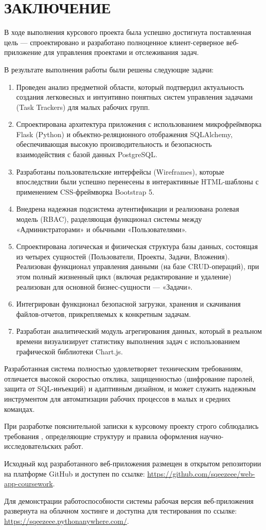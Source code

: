 \section*{ЗАКЛЮЧЕНИЕ}

В ходе выполнения курсового проекта была успешно достигнута поставленная цель --- спроектировано и разработано полноценное клиент-серверное веб-приложение для управления проектами и отслеживания задач.

В результате выполнения работы были решены следующие задачи:
\begin{enumerate}
    \item Проведен анализ предметной области, который подтвердил актуальность создания легковесных и интуитивно понятных систем управления задачами (Task Trackers) для малых рабочих групп.
    \item Спроектирована архитектура приложения с использованием микрофреймворка Flask (Python) и объектно-реляционного отображения SQLAlchemy, обеспечивающая высокую производительность и безопасность взаимодействия с базой данных PostgreSQL.
    \item Разработаны пользовательские интерфейсы (Wireframes), которые впоследствии были успешно перенесены в интерактивные HTML-шаблоны с применением CSS-фреймворка Bootstrap 5.
    \item Внедрена надежная подсистема аутентификации и реализована ролевая модель (RBAC), разделяющая функционал системы между «Администраторами» и обычными «Пользователями».
    \item Спроектирована логическая и физическая структура базы данных, состоящая из четырех сущностей (Пользователи, Проекты, Задачи, Вложения). Реализован функционал управления данными (на базе CRUD-операций), при этом полный жизненный цикл (включая редактирование и удаление) реализован для основной бизнес-сущности — «Задачи».
    \item Интегрирован функционал безопасной загрузки, хранения и скачивания файлов-отчетов, прикрепляемых к конкретным задачам.
    \item Разработан аналитический модуль агрегирования данных, который в реальном времени визуализирует статистику выполнения задач с использованием графической библиотеки Chart.js.
\end{enumerate}

Разработанная система полностью удовлетворяет техническим требованиям, отличается высокой скоростью отклика, защищенностью (шифрование паролей, защита от SQL-инъекций) и адаптивным дизайном, и может служить надежным инструментом для автоматизации рабочих процессов в малых и средних командах.

При разработке пояснительной записки к курсовому проекту строго соблюдались требования \cite{gost_report}, определяющие структуру и правила оформления научно-исследовательских работ.

Исходный код разработанного веб-приложения размещен в открытом репозитории на платформе GitHub и доступен по ссылке: \url{https://github.com/sqeezeee/web-app-coursework}.

Для демонстрации работоспособности системы рабочая версия веб-приложения развернута на облачном хостинге и доступна для тестирования по ссылке: \url{https://sqeezeee.pythonanywhere.com/}.